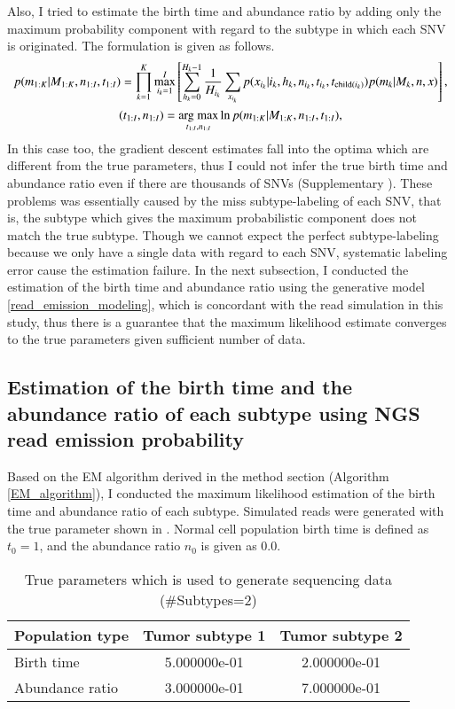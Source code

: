 \documentclass{article}
\begin{document}
Also, I tried to estimate the birth time and abundance ratio by adding only the maximum probability component with regard to the subtype in which each SNV is originated.
The formulation is given as follows.
\begin{gather}
 p(m_{1:K}|M_{1:K}, n_{1:I}, t_{1:I}) = \prod_{k=1}^{K} \max_{i_k=1}^{I} \left[\sum_{h_k=0}^{H_k-1} \frac{1}{H_{i_k}} \sum_{x_{i_k}} p(x_{i_k} | i_k, h_k, n_{i_k}, t_{i_k}, t_{\mathrm{child}(i_k)}) p (m_k | M_k, n, x)\right],\label{eq: binom_subtype_ungiven}\\
 (t_{1:I}, n_{1:I}) = \mathop{\rm arg~max}\limits_{t_{1:I}, n_{1:I}} \ln p(m_{1:K} | M_{1:K}, n_{1:I}, t_{1:I}),
\end{gather}
In this case too, the gradient descent estimates fall into the optima which are different from the true parameters, thus I could not infer the true birth time and abundance ratio even if there are thousands of SNVs (Supplementary ).
These problems was essentially caused by the miss subtype-labeling of each SNV, that is, the subtype which gives the maximum probabilistic component does not match the true subtype.
Though we cannot expect the perfect subtype-labeling because we only have a single data with regard to each SNV, systematic labeling error cause the estimation failure.
In the next subsection, I conducted the estimation of the birth time and abundance ratio using the generative model \eqref{read_emission_modeling}, which is concordant with the read simulation in this study, thus there is a guarantee that the maximum likelihood estimate converges to the true parameters given sufficient number of data.

\subsection{Estimation of the birth time and the abundance ratio of each subtype using NGS read emission probability}
Based on the EM algorithm derived in the method section (Algorithm \ref{EM_algorithm}), I conducted the maximum likelihood estimation of the birth time and abundance ratio of each subtype.
Simulated reads were generated with the true parameter shown in . Normal cell population birth time is defined as $t_{0}=1$, and the abundance ratio $n_{0}$ is given as 0.0.

\begin{table}[H]
\begin{center}
 \caption{True parameters which is used to generate sequencing data (\#Subtypes=2)}
 \label{tab: true_parameters_0.5_0.4_3}
  \begin{tabular}[t]{lcc}\toprule
  Population type & Tumor subtype 1 & Tumor subtype 2\\\midrule
   Birth time & 5.000000e-01 & 2.000000e-01\\
   Abundance ratio & 3.000000e-01 & 7.000000e-01\\\bottomrule
 \end{tabular}
\end{center}
\end{table}
\end{document}
